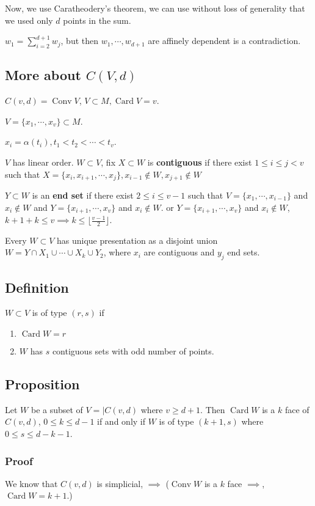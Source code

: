 \documentclass[11pt]{article}
\def\conv{\operatorname{Conv}}
\def\card{\operatorname{Card}}
\begin{document}
{{Now, we use Caratheodery's theorem, we can use without loss of generality
that we used only \(d\) points in the sum.

\(w_1 = \sum_{i=2}^{d+1} w_j\), but then \(w_1, \cdots, w_{d+1}\) are affinely
dependent is a contradiction.
\subsection{More about \(C(V, d)\)}
\label{sec:orgc615d8a}
\(C(v, d) = \conv V\), \(V \subset M, \card V = v\).

\(V = \{x_1, \cdots, x_v\} \subset M\).

\(x_i = \alpha(t_i), t_1 < t_2 < \cdots < t_v\).

\(V\) has linear order. \(W \subset V\), fix \(X \subset W\) is \textbf{contiguous} if
there exist \(1 \le i \le j < v\) such that \(X = \{x_i, x_{i+1}, \cdots ,x_j\},
   x_{i-1}\notin W, x_{j+1} \notin W\)

\(Y \subset W\) is an \textbf{end set} if there exist \(2 \le i \le v-1\) such that \(V =
   \{x_1, \cdots, x_{i-1}\}\) and \(x_i \notin W\) and \(Y = \{x_{i+1}, \cdots,
   x_v\}\) and \(x_i \notin W\). or \(Y = \{x_{i+1}, \cdots, x_v\}\) and \(x_i \notin
   W\), \(k+1 + k \le v \implies k \le \lfloor \frac{v-1}{2}\rfloor\).

Every \(W \subset V\) has unique presentation as a disjoint union \(W = Y\cap
   X_1 \cup \cdots \cup X_k \cup Y_2\), where \(x_i\) are contiguous and \(y_j\) end
sets.
\subsection{Definition}
\label{sec:orga3cd8ad}
\(W \subset V\) is of type \((r, s)\) if 

\begin{enumerate}
\item \(\card W = r\)
\item \(W\) has \(s\) contiguous sets with odd number of points.
\end{enumerate}
\subsection{Proposition}
\label{sec:orge3a09d4}
Let \(W\) be a subset of \(V = \vert C(v, d)\) where \(v \ge d + 1\). Then \(\card
   W\) is a \(k\) face of \(C(v, d)\), \(0 \le k \le d-1\) if and only if \(W\) is of
type \((k+1, s)\) where \(0 \le s \le d - k -1\).
\subsubsection{Proof}
\label{sec:orgdeb3613}
We know that \(C(v, d)\) is simplicial, \(\implies\) (\(\conv W\) is a \(k\) face
\(\implies\), \(\card W = k+1\).)

}}
\end{document}
